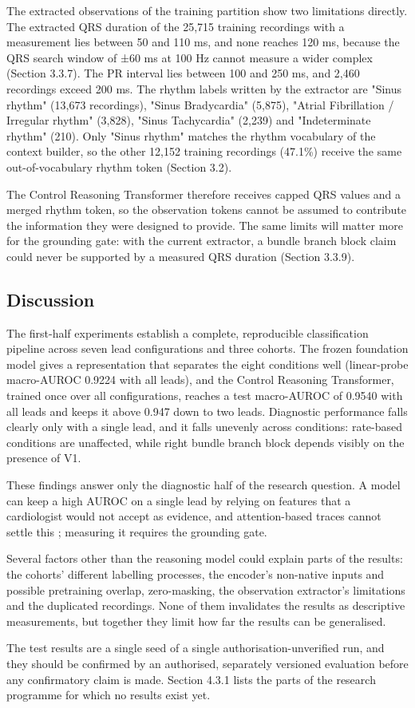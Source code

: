 The extracted observations of the training partition show two limitations directly. The extracted QRS duration of the 25,715 training recordings with a measurement lies between 50 and 110 ms, and none reaches 120 ms, because the QRS search window of ±60 ms at 100 Hz cannot measure a wider complex (Section 3.3.7). The PR interval lies between 100 and 250 ms, and 2,460 recordings exceed 200 ms. The rhythm labels written by the extractor are "Sinus rhythm" (13,673 recordings), "Sinus Bradycardia" (5,875), "Atrial Fibrillation / Irregular rhythm" (3,828), "Sinus Tachycardia" (2,239) and "Indeterminate rhythm" (210). Only "Sinus rhythm" matches the rhythm vocabulary of the context builder, so the other 12,152 training recordings (47.1\%) receive the same out-of-vocabulary rhythm token (Section 3.2).

The Control Reasoning Transformer therefore receives capped QRS values and a merged rhythm token, so the observation tokens cannot be assumed to contribute the information they were designed to provide. The same limits will matter more for the grounding gate: with the current extractor, a bundle branch block claim could never be supported by a measured QRS duration (Section 3.3.9).

\subsection{Discussion}\label{sec:ch4_4_9}

The first-half experiments establish a complete, reproducible classification pipeline across seven lead configurations and three cohorts. The frozen foundation model gives a representation that separates the eight conditions well (linear-probe macro-AUROC 0.9224 with all leads), and the Control Reasoning Transformer, trained once over all configurations, reaches a test macro-AUROC of 0.9540 with all leads and keeps it above 0.947 down to two leads. Diagnostic performance falls clearly only with a single lead, and it falls unevenly across conditions: rate-based conditions are unaffected, while right bundle branch block depends visibly on the presence of V1.

These findings answer only the diagnostic half of the research question. A model can keep a high AUROC on a single lead by relying on features that a cardiologist would not accept as evidence, and attention-based traces cannot settle this \cite{JAIN2019ATTENTION}; measuring it requires the grounding gate.

Several factors other than the reasoning model could explain parts of the results: the cohorts' different labelling processes, the encoder's non-native inputs and possible pretraining overlap, zero-masking, the observation extractor's limitations and the duplicated recordings. None of them invalidates the results as descriptive measurements, but together they limit how far the results can be generalised.

The test results are a single seed of a single authorisation-unverified run, and they should be confirmed by an authorised, separately versioned evaluation before any confirmatory claim is made. Section 4.3.1 lists the parts of the research programme for which no results exist yet.